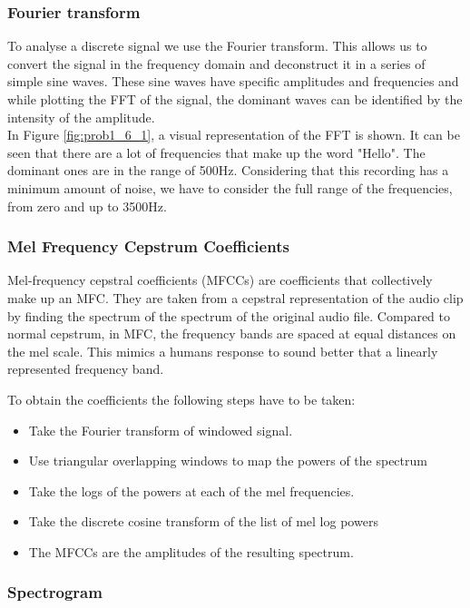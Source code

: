 \subsubsection{ Fourier transform}


To analyse a discrete signal we use the Fourier transform. 
This allows us to convert the signal in the frequency domain and deconstruct it in a series of simple sine waves. 
These sine waves have specific amplitudes and frequencies and while plotting the FFT of the signal, 
the dominant waves can be identified by the intensity of the amplitude.\\

In Figure \ref{fig:prob1_6_1}, a visual representation of the FFT is shown. 
It can be seen that there are a lot of frequencies that make up the word "Hello". 
The dominant ones are in the range of 500Hz. 
Considering that this recording has a minimum amount of noise,
we have to consider the full range of the frequencies,
from zero and up to 3500Hz.

\subsubsection{ Mel Frequency Cepstrum Coefficients}

Mel-frequency cepstral coefficients (MFCCs) are coefficients that collectively make up an MFC. 
They are taken from a cepstral representation of the audio clip by finding the spectrum of the spectrum of the original audio file.
 Compared to normal cepstrum, in MFC, the frequency bands are spaced at equal distances on the mel scale.
 This mimics a humans response to sound better that a linearly represented frequency band.

To obtain the coefficients the following steps have to be taken:
\begin{itemize}
	\item Take the Fourier transform of windowed signal.
	\item Use triangular overlapping windows to map the powers of the spectrum
	\item Take the logs of the powers at each of the mel frequencies.
	\item Take the discrete cosine transform of the list of mel log powers
	\item The MFCCs are the amplitudes of the resulting spectrum.

\end{itemize}


\subsubsection{ Spectrogram}


